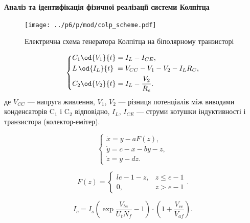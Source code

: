 \documentclass[14pt,handout,utf8]{beamer}
\newcommand{\Xhead}[1]{
 \begin{center}%
      \textbf{#1}%
 \end{center}%
}
\begin{document}
\begin{frame}
  \frametitle{~}

  \Xhead{Аналіз та ідентифікація фізичної реалізації системи Колпітца}

  \begin{figure}[htb!]
    \begin{center}
      \texttt{[image: ../p6/p/mod/colp\_scheme.pdf]}
    \end{center}
    \caption{Електрична схема генератора Колпітца на біполярному транзисторі}
    \label{atu:f:colp_schem}
  \end{figure}

  \vspace{-4ex}

  \begin{equation}
    \label{atu:eq:colp_phys}
    \begin{dcases}
      C_1 \od{V_{1}}{t}  = I_L - I_{CE} , \\
      L\, \od{I_L}{t} \; = V_{CC} - V_{1} - V_{2} - I_L R_C , \\
      C_2 \od{V_{2}}{t}  = I_L - \frac{V_{2}}{R_e}.
    \end{dcases}
  \end{equation}
  де
  $V_{CC} $ --- напруга живлення,
  $V_1 $, $ V_2 $ --- різниця потенціалів між виводами конденсаторів
  $\mathrm{C}_1 $ і
  $\mathrm{C}_2 $ відповідно,
  $I_L $,
  $I_{CE} $ --- струми котушки індуктивності і транзистора (колектор-емітер).

  \begin{equation}
    \label{atu:eq:colp}
    \begin{cases}
      \dot{x} = y - a F(z), \\
      \dot{y} = c - x - by - z, \\
      \dot{z} = y - d z.
    \end{cases}
  \end{equation}

  \[
    F(z) =
      \begin{cases}{l}
        e-1-z, & z \le e-1  \\
        0,     & z  >  e-1
      \end{cases}.
  \]

  \begin{equation}
    I_c
    = I_s \left( \exp\frac{V_{be}}{U_t N_f} - 1 \right)
    \cdot
    \left( 1 + \frac{V_{ce}}{V_{af}}\right).
    \label{atu:eq:bjt_model_sub}
  \end{equation}

\end{frame}
\end{document}
